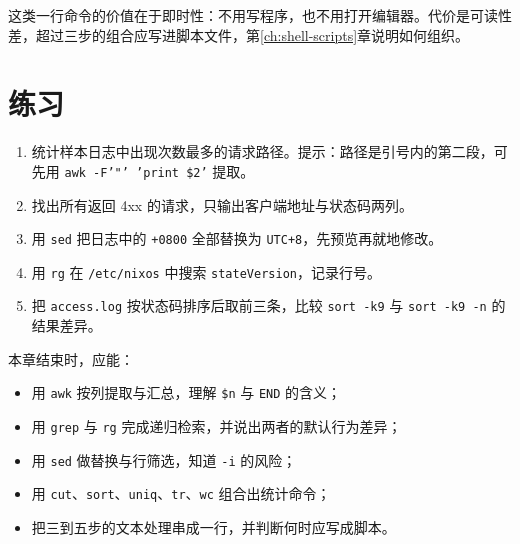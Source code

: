 这类一行命令的价值在于即时性：不用写程序，也不用打开编辑器。代价是可读性差，超过三步的组合应写进脚本文件，第\ref{ch:shell-scripts}章说明如何组织。

\section{练习}

\begin{enumerate}
  \item 统计样本日志中出现次数最多的请求路径。提示：路径是引号内的第二段，可先用 \texttt{awk -F'"' '{print \$2}'} 提取。
  \item 找出所有返回 4xx 的请求，只输出客户端地址与状态码两列。
  \item 用 \texttt{sed} 把日志中的 \texttt{+0800} 全部替换为 \texttt{UTC+8}，先预览再就地修改。
  \item 用 \texttt{rg} 在 \texttt{/etc/nixos} 中搜索 \texttt{stateVersion}，记录行号。
  \item 把 \texttt{access.log} 按状态码排序后取前三条，比较 \texttt{sort -k9} 与 \texttt{sort -k9 -n} 的结果差异。
\end{enumerate}

\begin{checkpoint}
本章结束时，应能：
\begin{itemize}
  \item 用 \texttt{awk} 按列提取与汇总，理解 \texttt{\$n} 与 \texttt{END} 的含义；
  \item 用 \texttt{grep} 与 \texttt{rg} 完成递归检索，并说出两者的默认行为差异；
  \item 用 \texttt{sed} 做替换与行筛选，知道 \texttt{-i} 的风险；
  \item 用 \texttt{cut}、\texttt{sort}、\texttt{uniq}、\texttt{tr}、\texttt{wc} 组合出统计命令；
  \item 把三到五步的文本处理串成一行，并判断何时应写成脚本。
\end{itemize}
\end{checkpoint}
